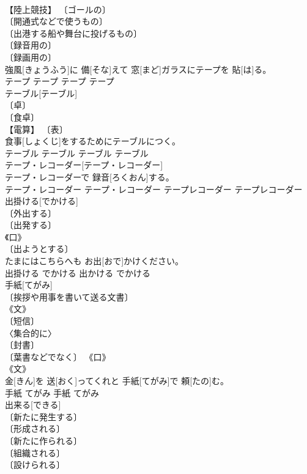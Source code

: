 \documentclass[8pt]{extreport}
\begin{document}
\begin{CJK}{UTF8}{min}
\\	【陸上競技】 〔ゴールの〕 
\\	〔開通式などで使うもの〕 
\\	〔出港する船や舞台に投げるもの〕 
\\	〔録音用の〕 
\\	〔録画用の〕 
\\	強風[きょうふう]に 備[そな]えて 窓[まど]ガラスにテープを 貼[は]る。	
\\	テープ	テープ	テープ	テープ	
\\	テーブル[テーブル]	
\\	〔卓〕 
\\	〔食卓〕 
\\	【電算】 〔表〕 
\\	食事[しょくじ]をするためにテーブルにつく。	
\\	テーブル	テーブル	テーブル	テーブル	
\\	テープ・レコーダー[テープ・レコーダー]	
\\	テープ・レコーダーで 録音[ろくおん]する。	
\\	テープ・レコーダー	テープ・レコーダー	テープレコーダー	テープレコーダー	
\\	出掛ける[でかける]	
\\	〔外出する〕 
\\	〔出発する〕 
\\	《口》 
\\	〔出ようとする〕 
\\	たまにはこちらへも お出[おで]かけください。	
\\	出掛ける	でかける	出かける	でかける	
\\	手紙[てがみ]	
\\	〔挨拶や用事を書いて送る文書〕 
\\	《文》 
\\	〔短信〕 
\\	〈集合的に〉 
\\	〔封書〕 
\\	〔葉書などでなく〕 《口》 
\\	《文》 
\\	金[きん]を 送[おく]ってくれと 手紙[てがみ]で 頼[たの]む。	
\\	手紙	てがみ	手紙	てがみ	
\\	出来る[できる]	
\\	〔新たに発生する〕 
\\	〔形成される〕 
\\	〔新たに作られる〕 
\\	〔組織される〕 
\\	〔設けられる〕 

\end{CJK}
\end{document}
